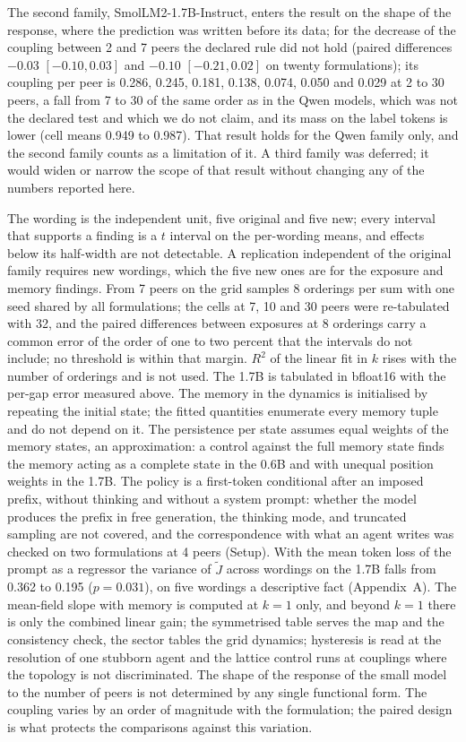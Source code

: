\documentclass[11pt]{article}
\begin{document}
The second family, SmolLM2-1.7B-Instruct, enters the result on the shape of
the response, where the prediction was written before its data; for the
decrease of the coupling between 2 and 7 peers the declared rule did not
hold (paired differences $-0.03$ $[-0.10, 0.03]$ and $-0.10$ $[-0.21, 0.02]$
on twenty formulations); its coupling per peer is 0.286, 0.245, 0.181, 0.138, 0.074, 0.050 and 0.029 at 2 to 30 peers, a fall from 7 to 30 of the same order as in the Qwen models, which was not the declared test and which we do not claim,
and its mass on the label tokens is lower (cell means 0.949 to 0.987).
That result holds for the Qwen family only, and the second family counts as a limitation of it. A third family was deferred; it would widen or narrow the scope of that result without changing any of the numbers reported here.

The wording is the independent unit, five original and five new; every interval that supports a finding is a $t$ interval on the per-wording means, and effects below its half-width are not detectable. A replication independent of the original
family requires new wordings, which the five new ones are for the exposure
and memory findings. From 7 peers on the grid samples 8 orderings per sum with one seed shared
by all formulations; the cells at 7, 10 and 30 peers were re-tabulated with
32, and the paired differences between exposures at 8 orderings carry a
common error of the order of one to two percent that the intervals do not
include; no threshold is within that margin. $R^2$ of the linear fit in $k$
rises with the number of orderings and is not used. The 1.7B is tabulated
in bfloat16 with the per-gap error measured above. The memory in the
dynamics is initialised by repeating the initial state; the fitted
quantities enumerate every memory tuple and do not depend on it. The
persistence per state assumes equal weights of the memory states, an
approximation: a control against the full memory state finds the memory
acting as a complete state in the 0.6B and with unequal position weights
in the 1.7B. The policy is a first-token conditional after an imposed
prefix, without thinking and without a system prompt: whether the model
produces the prefix in free generation, the thinking mode, and truncated
sampling are not covered, and the correspondence with what an agent
writes was checked on two formulations at 4 peers (Setup). With the mean token loss of the prompt as a
regressor the variance of $\tilde J$ across wordings on the 1.7B falls
from 0.362 to 0.195 ($p = 0.031$), on five wordings a
descriptive fact (Appendix~A). The mean-field slope with memory is
computed at $k=1$ only, and beyond $k=1$ there is only the combined linear gain; the symmetrised table serves the
map and the consistency check, the sector tables the grid dynamics;
hysteresis is read at the resolution of one stubborn agent and the lattice
control runs at couplings where the topology is not discriminated. The
shape of the response of the small model to the number of peers is not
determined by any single functional form. The coupling varies by an order of magnitude with the formulation; the paired design is what protects the comparisons against this variation.
\end{document}
